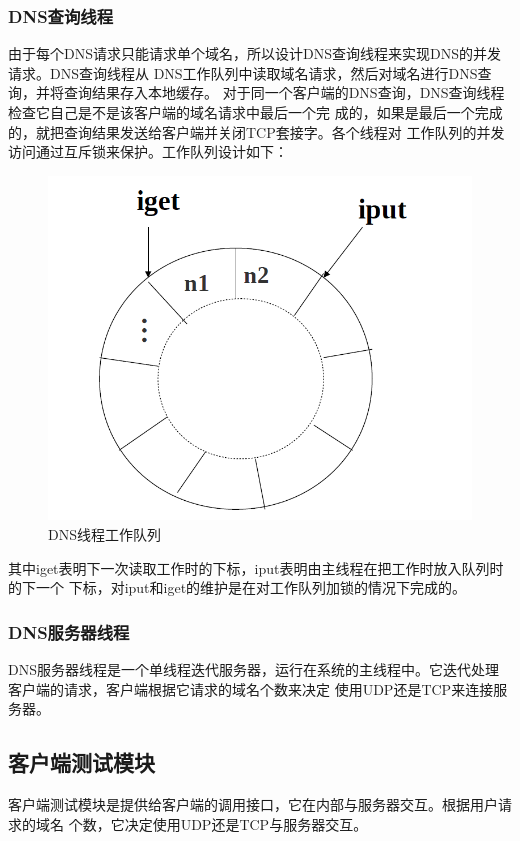 \subsubsection{DNS查询线程}
由于每个DNS请求只能请求单个域名，所以设计DNS查询线程来实现DNS的并发请求。DNS查询线程从
DNS工作队列中读取域名请求，然后对域名进行DNS查询，并将查询结果存入本地缓存。
对于同一个客户端的DNS查询，DNS查询线程检查它自己是不是该客户端的域名请求中最后一个完
成的，如果是最后一个完成的，就把查询结果发送给客户端并关闭TCP套接字。各个线程对
工作队列的并发访问通过互斥锁来保护。工作队列设计如下：
\begin{figure}[H]
\centering
\includegraphics[keepaspectratio, scale = 0.4]{pitures/dnsxianchengduilie.png}
\caption{DNS线程工作队列} 
\end{figure}
其中iget表明下一次读取工作时的下标，iput表明由主线程在把工作时放入队列时的下一个
下标，对iput和iget的维护是在对工作队列加锁的情况下完成的。
\subsubsection{DNS服务器线程}
DNS服务器线程是一个单线程迭代服务器，运行在系统的主线程中。它迭代处理
客户端的请求，客户端根据它请求的域名个数来决定
使用UDP还是TCP来连接服务器。
\subsection{客户端测试模块}
客户端测试模块是提供给客户端的调用接口，它在内部与服务器交互。根据用户请求的域名
个数，它决定使用UDP还是TCP与服务器交互。



